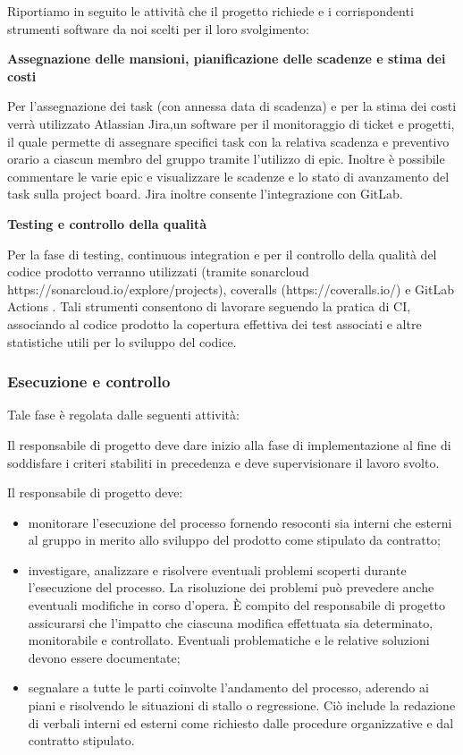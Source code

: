 Riportiamo in seguito le attività che il progetto richiede e i corrispondenti strumenti software da noi scelti per il loro svolgimento:

\textbf{Assegnazione delle mansioni, pianificazione delle scadenze e stima dei costi}

Per l'assegnazione dei task (con annessa data di scadenza) e per la stima dei costi verrà utilizzato  Atlassian Jira,un software per il monitoraggio di ticket e progetti, il quale permette di assegnare specifici task con la relativa scadenza e preventivo orario a ciascun membro del gruppo tramite l'utilizzo di epic. Inoltre è possibile commentare le varie epic e visualizzare le scadenze e lo stato di avanzamento del task sulla project board. Jira inoltre consente l'integrazione con GitLab.

\textbf{Testing e controllo della qualità}

Per la fase di testing, continuous integration e per il controllo della qualità del codice prodotto verranno utilizzati  (tramite sonarcloud https://sonarcloud.io/explore/projects), coveralls (https://coveralls.io/) e GitLab Actions . Tali strumenti consentono di lavorare seguendo la pratica di CI, associando al codice prodotto la copertura effettiva dei test associati e altre  statistiche utili per lo sviluppo del codice.

\subsubsection{Esecuzione e controllo}
Tale fase è regolata dalle seguenti attività:

Il responsabile di progetto deve dare inizio alla fase di implementazione al fine di soddisfare i criteri stabiliti in precedenza e deve supervisionare il lavoro svolto.

Il responsabile di progetto deve:
\begin{itemize}
    \item monitorare l'esecuzione del processo fornendo resoconti sia interni che esterni al gruppo in merito allo sviluppo del prodotto come stipulato da contratto;
    \item investigare, analizzare e risolvere eventuali problemi scoperti durante l'esecuzione del processo. La risoluzione dei problemi può prevedere anche eventuali modifiche in corso d'opera. È compito del responsabile di progetto assicurarsi che l'impatto che ciascuna modifica effettuata sia determinato, monitorabile e controllato. Eventuali problematiche e le relative soluzioni devono essere documentate;
    \item segnalare a tutte le parti coinvolte l'andamento del processo, aderendo ai piani e risolvendo le situazioni di stallo o regressione. Ciò include la redazione di verbali interni ed esterni come richiesto dalle procedure organizzative e dal contratto stipulato.
\end{itemize}

